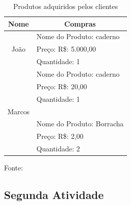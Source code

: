 \begin{table}[H]
  \caption{Produtos adquiridos pelos clientes}
  \center
  \begin{tabular}{ | c | c |}
      \hline
      \textbf{Nome} & \textbf{Compras} \\
      \hline
           &  \multicolumn{1}{l|}{Nome do Produto: caderno} \\
        João  & \multicolumn{1}{l|}{Preço: R\$: 5.000,00}  \\
          & \multicolumn{1}{l|}{Quantidade: 1 } \\
      \hline
           &  \multicolumn{1}{l|}{Nome do Produto: caderno} \\
          & \multicolumn{1}{l|}{Preço: R\$: 20,00}  \\
          & \multicolumn{1}{l|}{Quantidade: 1 } \\
        Marcos  & \\
          & \multicolumn{1}{l|}{Nome do Produto: Borracha} \\
          & \multicolumn{1}{l|}{Preço: R\$: 2,00} \\
          & \multicolumn{1}{l|}{Quantidade: 2} \\
      \hline

  \end{tabular}
  \label{tab:com}
  \flushleft %

  {\fontsize{10pt}{\baselineskip}\selectfont
    Fonte: }
\end{table}

\subsection{Segunda Atividade}\label{2atividae}



